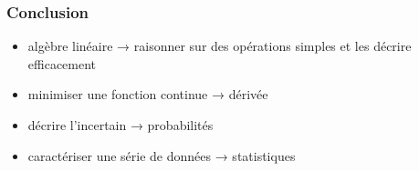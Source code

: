 
\begin{frame}
  \frametitle{Conclusion}

  \begin{itemize}
  \item algèbre linéaire → raisonner sur des opérations simples
    et les décrire efficacement
  \item minimiser une fonction continue → dérivée
  \item décrire l'incertain → probabilités
  \item caractériser une série de données → statistiques
  \end{itemize}
\end{frame}
